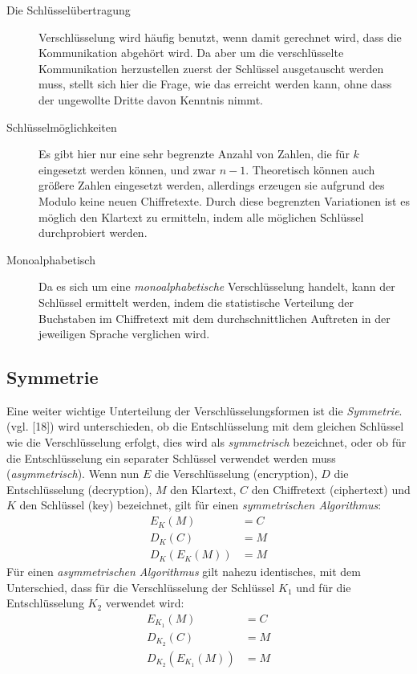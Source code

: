 \documentclass{scrarticle} %
\begin{document}
    \begin{description}
        \item[Die Schlüsselübertragung] Verschlüsselung wird häufig benutzt, wenn damit gerechnet wird, dass die Kommunikation abgehört wird. Da aber um die verschlüsselte Kommunikation herzustellen zuerst der Schlüssel ausgetauscht werden muss, stellt sich hier die Frage, wie das erreicht werden kann, ohne dass der ungewollte Dritte davon Kenntnis nimmt.
        \item[Schlüsselmöglichkeiten] Es gibt hier nur eine sehr begrenzte Anzahl von Zahlen, die für $k$ eingesetzt werden können, und zwar $n-1$. Theoretisch können auch größere Zahlen eingesetzt werden, allerdings erzeugen sie aufgrund des Modulo keine neuen Chiffretexte. Durch diese begrenzten Variationen ist es möglich den Klartext zu ermitteln, indem alle möglichen Schlüssel durchprobiert werden.
        \item[Monoalphabetisch] Da es sich um eine \emph{monoalphabetische} Verschlüsselung handelt, kann der Schlüssel ermittelt werden, indem die statistische Verteilung der Buchstaben im Chiffretext mit dem durchschnittlichen Auftreten in der jeweiligen Sprache verglichen wird.
    \end{description}

    \subsection{Symmetrie}  %
        Eine weiter wichtige Unterteilung der Verschlüsselungsformen ist die \emph{Symmetrie}. (vgl. \cite{ertel2003}[18]) wird unterschieden, ob die Entschlüsselung mit dem gleichen Schlüssel wie die Verschlüsselung erfolgt, dies wird als \emph{symmetrisch} bezeichnet, oder ob für die Entschlüsselung ein separater Schlüssel verwendet werden muss (\emph{asymmetrisch}). Wenn nun $E$ die Verschlüsselung (encryption), $D$ die Entschlüsselung (decryption), $M$ den Klartext, $C$ den Chiffretext (ciphertext) und $K$ den Schlüssel (key) bezeichnet, gilt für einen \emph{symmetrischen Algorithmus}:
        \begin{align}
            E_K(M) &= C\\
            D_K(C) &= M\\
            D_K\left(E_K(M)\right) &= M
        \end{align}
        Für einen \emph{asymmetrischen Algorithmus} gilt nahezu identisches, mit dem Unterschied, dass für die Verschlüsselung der Schlüssel $K_1$ und für die Entschlüsselung $K_2$ verwendet wird:    %
        \begin{align}
            E_{K_1}(M) &= C\\
            D_{K_2}(C) &= M\\
            D_{K_2}\left(E_{K_1}(M)\right) &= M
        \end{align}



    \newpage
    \printbibliography
\end{document}
